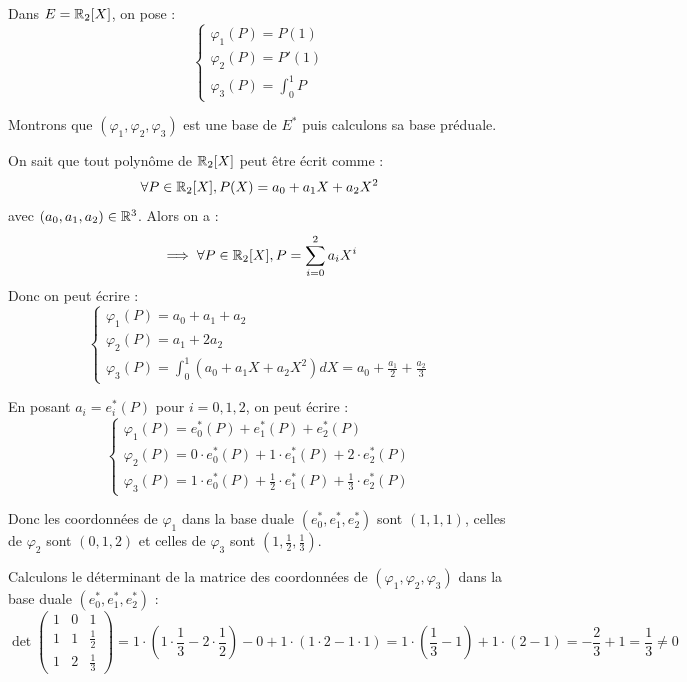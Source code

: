 \documentclass[11pt,a4paper]{report}
\begin{document}
\begin{example}
    Dans $E = \mathbb{R}_2[X]$, on pose :
    $$\begin{cases}
        \varphi_1(P) = P(1) \\
        \varphi_2(P) = P'(1) \\
        \varphi_3(P) = \int_0^1 P
    \end{cases}$$

    Montrons que $(\varphi_1, \varphi_2, \varphi_3)$ est une base de $E^*$ puis calculons sa base préduale.

    On sait que tout polynôme de $\mathbb{R}_2[X]$ peut être écrit comme :
    $$\forall P \in \mathbb{R}_2[X], P(X) = a_0 + a_1 X + a_2 X^2$$
    avec $(a_0, a_1, a_2) \in \mathbb{R}^3$. Alors on a :
    $$\implies \forall P \in \mathbb{R}_2[X], P = \sum_{i=0}^2 a_i X^i$$
    Donc on peut écrire :
    $$\begin{cases}
        \varphi_1(P) = a_0 + a_1 + a_2 \\
        \varphi_2(P) = a_1 + 2a_2 \\
        \varphi_3(P) = \int_0^1 (a_0 + a_1 X + a_2 X^2) dX = a_0 + \frac{a_1}{2} + \frac{a_2}{3}
    \end{cases}$$

    En posant $a_i = e_i^*(P)$ pour $i=0,1,2$, on peut écrire :
    $$\begin{cases}
        \varphi_1(P) = e_0^*(P) + e_1^*(P) + e_2^*(P) \\
        \varphi_2(P) = 0 \cdot e_0^*(P) + 1 \cdot e_1^*(P) + 2 \cdot e_2^*(P) \\
        \varphi_3(P) = 1 \cdot e_0^*(P) + \frac{1}{2} \cdot e_1^*(P) + \frac{1}{3} \cdot e_2^*(P)
    \end{cases}$$

    Donc les coordonnées de $\varphi_1$ dans la base duale $(e_0^*, e_1^*, e_2^*)$ sont $(1, 1, 1)$, celles de $\varphi_2$ sont $(0, 1, 2)$ et celles de $\varphi_3$ sont $(1, \frac{1}{2}, \frac{1}{3})$.

    Calculons le déterminant de la matrice des coordonnées de $(\varphi_1, \varphi_2, \varphi_3)$ dans la base duale $(e_0^*, e_1^*, e_2^*)$ :
    $$\det\begin{pmatrix}
        1 & 0 & 1 \\
        1 & 1 & \frac{1}{2} \\
        1 & 2 & \frac{1}{3}
    \end{pmatrix} = 1 \cdot (1 \cdot \frac{1}{3} - 2 \cdot \frac{1}{2}) - 0 + 1 \cdot (1 \cdot 2 - 1 \cdot 1) = 1 \cdot (\frac{1}{3} - 1) + 1 \cdot (2 - 1) = -\frac{2}{3} + 1 = \frac{1}{3} \ne 0$$


\end{example}
\end{document}
